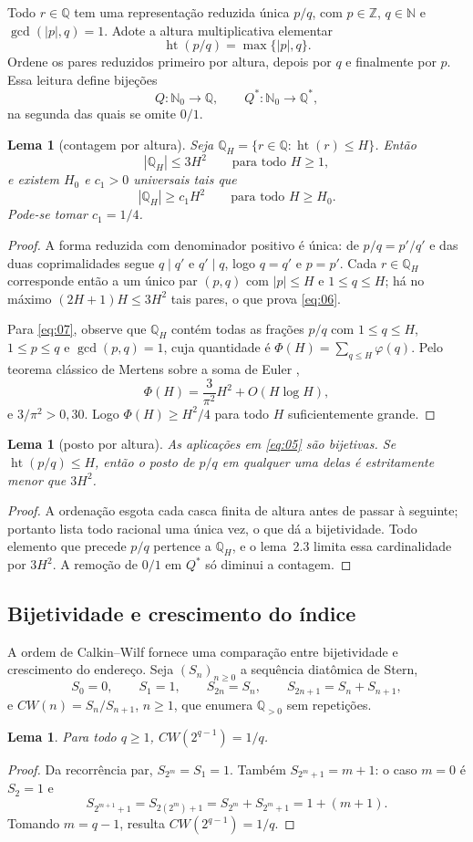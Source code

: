 \documentclass[11pt,a4paper]{article}
\theoremstyle{preciso}
\newtheorem{lema}[teorema]{Lema}
\theoremstyle{definition}
\newcommand{\N}{\mathbb N}
\newcommand{\Z}{\mathbb Z}
\newcommand{\Q}{\mathbb Q}
\newcommand{\heightq}{\operatorname{ht}}
\newcommand{\eqn}[2]{\begin{equation}\label{eq:#1}#2\end{equation}}
\begin{document}
Todo $r\in\Q$ tem uma representação reduzida única $p/q$, com $p\in\Z$, $q\in\N$ e $\gcd(|p|,q)=1$. Adote a altura multiplicativa elementar
\eqn{04}{\heightq(p/q)=\max\{|p|,q\}.}
Ordene os pares reduzidos primeiro por altura, depois por $q$ e finalmente por $p$. Essa leitura define bijeções
\eqn{05}{Q:\N_0\to\Q,\qquad Q^*:\N_0\to\Q^*,}
na segunda das quais se omite $0/1$.

\begin{lema}[contagem por altura]
Seja $\Q_H=\{r\in\Q:\heightq(r)\le H\}$. Então
\eqn{06}{|\Q_H|\le3H^2\qquad\text{para todo }H\ge1,}
e existem $H_0$ e $c_1>0$ universais tais que
\eqn{07}{|\Q_H|\ge c_1H^2\qquad\text{para todo }H\ge H_0.}
Pode-se tomar $c_1=1/4$.
\end{lema}
\begin{proof}
A forma reduzida com denominador positivo é única: de $p/q=p'/q'$ e das duas coprimalidades segue $q\mid q'$ e $q'\mid q$, logo $q=q'$ e $p=p'$. Cada $r\in\Q_H$ corresponde então a um único par $(p,q)$ com $|p|\le H$ e $1\le q\le H$; há no máximo $(2H+1)H\le3H^2$ tais pares, o que prova \eqref{eq:06}.

Para \eqref{eq:07}, observe que $\Q_H$ contém todas as frações $p/q$ com $1\le q\le H$, $1\le p\le q$ e $\gcd(p,q)=1$, cuja quantidade é $\Phi(H)=\sum_{q\le H}\varphi(q)$. Pelo teorema clássico de Mertens sobre a soma de Euler \citep[Teorema 330]{hardy2008},
\[
\Phi(H)=\frac3{\pi^2}H^2+O(H\log H),
\]
e $3/\pi^2>0{,}30$. Logo $\Phi(H)\ge H^2/4$ para todo $H$ suficientemente grande.
\end{proof}

\begin{lema}[posto por altura]
As aplicações em \eqref{eq:05} são bijetivas. Se $\heightq(p/q)\le H$, então o posto de $p/q$ em qualquer uma delas é estritamente menor que $3H^2$.
\end{lema}
\begin{proof}
A ordenação esgota cada casca finita de altura antes de passar à seguinte; portanto lista todo racional uma única vez, o que dá a bijetividade. Todo elemento que precede $p/q$ pertence a $\Q_H$, e o lema~2.3 limita essa cardinalidade por $3H^2$. A remoção de $0/1$ em $Q^*$ só diminui a contagem.
\end{proof}

\subsection{Bijetividade e crescimento do índice}
A ordem de Calkin--Wilf fornece uma comparação entre bijetividade e crescimento do endereço. Seja $(S_n)_{n\ge0}$ a sequência diatômica de Stern,
\eqn{08}{S_0=0,\qquad S_1=1,\qquad S_{2n}=S_n,\qquad S_{2n+1}=S_n+S_{n+1},}
e $CW(n)=S_n/S_{n+1}$, $n\ge1$, que enumera $\Q_{>0}$ sem repetições.
\begin{lema}
Para todo $q\ge1$, $CW(2^{q-1})=1/q$.
\end{lema}
\begin{proof}
Da recorrência par, $S_{2^m}=S_1=1$. Também $S_{2^m+1}=m+1$: o caso $m=0$ é $S_2=1$ e
\[
S_{2^{m+1}+1}=S_{2(2^m)+1}=S_{2^m}+S_{2^m+1}=1+(m+1).
\]
Tomando $m=q-1$, resulta $CW(2^{q-1})=1/q$.
\end{proof}
\end{document}
